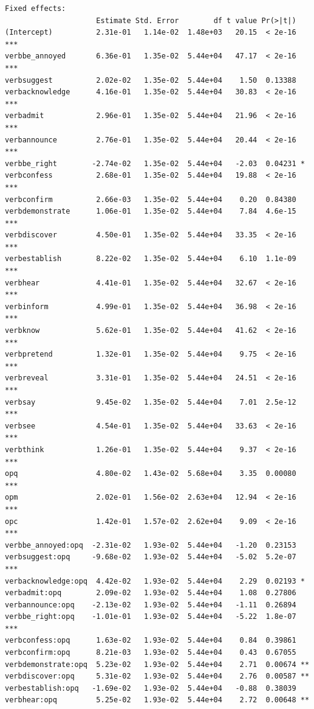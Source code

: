 \documentclass[10pt]{article}\usepackage[]{graphicx}\usepackage[dvipsnames]{xcolor}
\makeatletter
\newenvironment{kframe}{%
 \def\at@end@of@kframe{}%
 \ifinner\ifhmode%
  \def\at@end@of@kframe{\end{minipage}}%
  \begin{minipage}{\columnwidth}%
 \fi\fi%
 \def\FrameCommand##1{\hskip\@totalleftmargin \hskip-\fboxsep
 \colorbox{shadecolor}{##1}\hskip-\fboxsep
     \hskip-\linewidth \hskip-\@totalleftmargin \hskip\columnwidth}%
 \MakeFramed {\advance\hsize-\width
   \@totalleftmargin\z@ \linewidth\hsize
   \@setminipage}}%
 {\par\unskip\endMakeFramed%
 \at@end@of@kframe}
\newenvironment{knitrout}{}{} %
\makeatother
\begin{document}
\begin{knitrout}
\begin{kframe}
\begin{verbatim}
Fixed effects:
                     Estimate Std. Error        df t value Pr(>|t|)    
(Intercept)          2.31e-01   1.14e-02  1.48e+03   20.15  < 2e-16 ***
verbbe_annoyed       6.36e-01   1.35e-02  5.44e+04   47.17  < 2e-16 ***
verbsuggest          2.02e-02   1.35e-02  5.44e+04    1.50  0.13388    
verbacknowledge      4.16e-01   1.35e-02  5.44e+04   30.83  < 2e-16 ***
verbadmit            2.96e-01   1.35e-02  5.44e+04   21.96  < 2e-16 ***
verbannounce         2.76e-01   1.35e-02  5.44e+04   20.44  < 2e-16 ***
verbbe_right        -2.74e-02   1.35e-02  5.44e+04   -2.03  0.04231 *  
verbconfess          2.68e-01   1.35e-02  5.44e+04   19.88  < 2e-16 ***
verbconfirm          2.66e-03   1.35e-02  5.44e+04    0.20  0.84380    
verbdemonstrate      1.06e-01   1.35e-02  5.44e+04    7.84  4.6e-15 ***
verbdiscover         4.50e-01   1.35e-02  5.44e+04   33.35  < 2e-16 ***
verbestablish        8.22e-02   1.35e-02  5.44e+04    6.10  1.1e-09 ***
verbhear             4.41e-01   1.35e-02  5.44e+04   32.67  < 2e-16 ***
verbinform           4.99e-01   1.35e-02  5.44e+04   36.98  < 2e-16 ***
verbknow             5.62e-01   1.35e-02  5.44e+04   41.62  < 2e-16 ***
verbpretend          1.32e-01   1.35e-02  5.44e+04    9.75  < 2e-16 ***
verbreveal           3.31e-01   1.35e-02  5.44e+04   24.51  < 2e-16 ***
verbsay              9.45e-02   1.35e-02  5.44e+04    7.01  2.5e-12 ***
verbsee              4.54e-01   1.35e-02  5.44e+04   33.63  < 2e-16 ***
verbthink            1.26e-01   1.35e-02  5.44e+04    9.37  < 2e-16 ***
opq                  4.80e-02   1.43e-02  5.68e+04    3.35  0.00080 ***
opm                  2.02e-01   1.56e-02  2.63e+04   12.94  < 2e-16 ***
opc                  1.42e-01   1.57e-02  2.62e+04    9.09  < 2e-16 ***
verbbe_annoyed:opq  -2.31e-02   1.93e-02  5.44e+04   -1.20  0.23153    
verbsuggest:opq     -9.68e-02   1.93e-02  5.44e+04   -5.02  5.2e-07 ***
verbacknowledge:opq  4.42e-02   1.93e-02  5.44e+04    2.29  0.02193 *  
verbadmit:opq        2.09e-02   1.93e-02  5.44e+04    1.08  0.27806    
verbannounce:opq    -2.13e-02   1.93e-02  5.44e+04   -1.11  0.26894    
verbbe_right:opq    -1.01e-01   1.93e-02  5.44e+04   -5.22  1.8e-07 ***
verbconfess:opq      1.63e-02   1.93e-02  5.44e+04    0.84  0.39861    
verbconfirm:opq      8.21e-03   1.93e-02  5.44e+04    0.43  0.67055    
verbdemonstrate:opq  5.23e-02   1.93e-02  5.44e+04    2.71  0.00674 ** 
verbdiscover:opq     5.31e-02   1.93e-02  5.44e+04    2.76  0.00587 ** 
verbestablish:opq   -1.69e-02   1.93e-02  5.44e+04   -0.88  0.38039    
verbhear:opq         5.25e-02   1.93e-02  5.44e+04    2.72  0.00648 ** 

\end{verbatim}
\end{kframe}
\end{knitrout}
\end{document}
